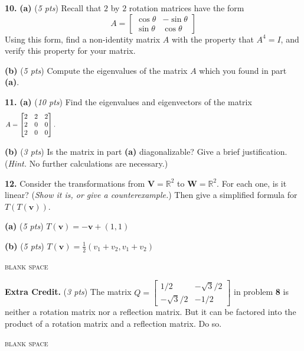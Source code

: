\documentclass[11pt]{amsart}
\newcommand{\bv}{\mathbf{v}}
\newcommand{\bV}{\mathbf{V}}
\newcommand{\bW}{\mathbf{W}}
\newcommand{\RR}{{\mathbb{R}}}
\newcommand{\ds}{\displaystyle}
\newcommand{\prob}[1]{\bigskip\noindent\textbf{#1.} }
\newcommand{\pts}[1]{(\emph{#1 pts})}
\newcommand{\probpts}[2]{\prob{#1} \pts{#2} \quad}
\newcommand{\ppartpts}[2]{\textbf{(#1)} \pts{#2} \quad}
\newcommand{\epartpts}[2]{\medskip\noindent \textbf{(#1)} \pts{#2} \quad}
\begin{document}
\prob{10} \ppartpts{a}{5}  Recall that $2$ by $2$ rotation matrices have the form
    $$A = \begin{bmatrix} \cos \theta & - \sin \theta \\ \sin \theta & \cos \theta \end{bmatrix}$$
Using this form, find a non-identity matrix $A$ with the property that {\large $A^4=I$}, and verify this property for your matrix.
\vfill

\epartpts{b}{5}  Compute the eigenvalues of the matrix $A$ which you found in part \textbf{(a)}.
\vfill


\clearpage\newpage
\prob{11} \ppartpts{a}{10}  Find the eigenvalues and eigenvectors of the matrix
    $$A = \begin{bmatrix} 2 & 2 & 2 \\ 2 & 0 & 0 \\ 2 & 0 & 0 \end{bmatrix}. \hspace{5.0in}$$
\vfill

\epartpts{b}{3}  Is the matrix in part \textbf{(a)} diagonalizable?  Give a brief justification.  (\emph{Hint.} No further calculations are necessary.)
\vspace{1.5in}


\clearpage\newpage
\prob{12}  Consider the transformations from $\bV=\RR^2$ to $\bW=\RR^2$.  For each one, is it linear?  (\emph{Show it is, or give a counterexample.})  Then give a simplified formula for $T(T(\bv))$.

\epartpts{a}{5}   $T(\bv) = -\bv + (1,1)$
\vfill

\epartpts{b}{5}   $T(\bv) = \frac{1}{2} (v_1+v_2,v_1+v_2)$
\vfill

\noindent \hrulefill
\begin{center}
\small
\textsc{blank space}
\end{center}
\vspace{2.0in}


\clearpage\newpage
\probpts{Extra Credit}{3}  The matrix $\ds Q = \begin{bmatrix} 1/2 & -\sqrt{3}/2 \\ -\sqrt{3}/2 & -1/2 \end{bmatrix}$ in problem \textbf{8} is neither a rotation matrix nor a reflection matrix.  But it can be factored into the product of a rotation matrix and a reflection matrix.  Do so.
\vfill

\noindent \hrulefill
\begin{center}
\small
\textsc{blank space}
\end{center}
\vspace{3.0in}
\end{document}
